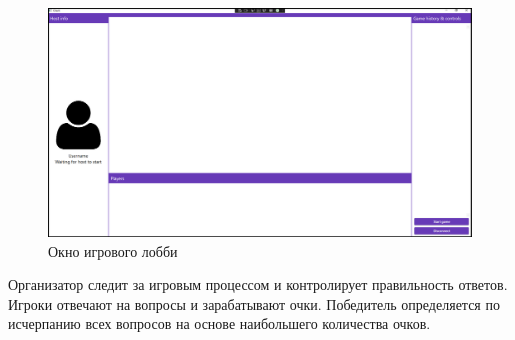 \begin{figure}
\centering
    \includegraphics[scale=0.45]{attachments/lobby_ui.png}
    \caption{Окно игрового лобби}
    \label{sec:manual:lobby_ui}
\end{figure}

Организатор следит за игровым процессом и контролирует правильность ответов. Игроки отвечают на вопросы и зарабатывают очки. Победитель определяется по исчерпанию всех вопросов
на основе наибольшего количества очков.